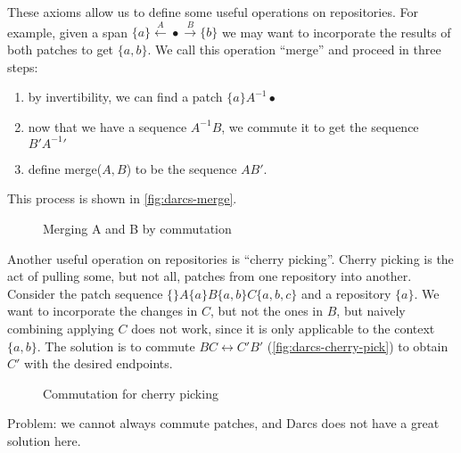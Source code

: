These axioms allow us to define some useful operations on repositories. For
example, given a span $\{a\} \xleftarrow{A} \bullet \xrightarrow{B} \{b\}$ we
may want to incorporate the results of both patches to get $\{a,b\}$. We call
this operation ``merge'' and proceed in three steps:
\begin{enumerate}
\item by invertibility, we can find a patch $\{a\}A^{-1} \bullet$
\item now that we have a sequence $A^{-1}B$, we commute it to get the sequence $B'{A^{-1}}'$
\item define merge($A, B$) to be the sequence $AB'$.
\end{enumerate}
This process is shown in \autoref{fig:darcs-merge}.

\begin{figure}
\begin{center}
\end{center}
\caption{Merging A and B by commutation}
\label{fig:darcs-merge}
\end{figure}

Another useful operation on repositories is ``cherry picking''. Cherry picking
is the act of pulling some, but not all, patches from one repository into another.
Consider the patch sequence $\{\}A\{a\}B\{a,b\}C\{a,b,c\}$ and a repository
$\{a\}$. We want to incorporate the changes in $C$, but not the ones in $B$, but
naively combining applying $C$ does not work, since it is only applicable to the
context $\{a,b\}$. The solution is to commute $BC \leftrightarrow C'B'$ (\autoref{fig:darcs-cherry-pick}) to
obtain $C'$ with the desired endpoints.

\begin{figure}
\begin{center}
\end{center}
\caption{Commutation for cherry picking}
\label{fig:darcs-cherry-pick}
\end{figure}

Problem: we cannot always commute patches, and Darcs does not have a great
solution here.